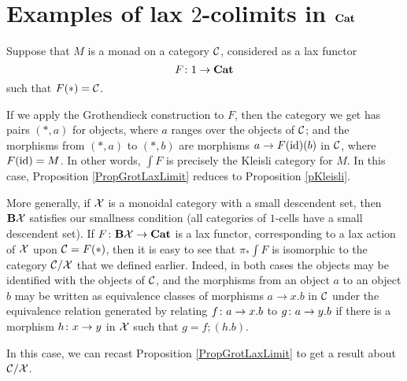 \section{Examples of lax $2$-colimits in ${\normalfont\textbf{Cat}}$}

Suppose that $M$ is a monad on a category ${\mathcal{C}}$, considered as a lax functor
\[
  F\colon 1\to {\normalfont\textbf{Cat}}
  \]
such that $F(*)={\mathcal{C}}$.

If we apply the Grothendieck construction to $F$, then the category we get has pairs $(*,a)$ for objects, where $a$ ranges over the objects of ${\mathcal{C}}$; and the morphisms from $(*,a)$ to $(*,b)$ are morphisms $a \to F(\operatorname{id})(b)$ in ${\mathcal{C}}$, where $F(\operatorname{id})=M$.  
In other words, $\int F$ is precisely the Kleisli category for $M$.
In this case, Proposition \ref{PropGrotLaxLimit} reduces to Proposition \ref{pKleisli}.

More generally, if $\mathcal X$ is a monoidal category with a small descendent set, then $\mathbf B\mathcal X$ satisfies our smallness condition (all categories of $1$-cells have a small descendent set).  
If $F\colon \mathbf B \mathcal X \to {\normalfont\textbf{Cat}}$ is a lax functor, corresponding to a lax action of $\mathcal X$ upon ${\mathcal{C}} = F(*)$, then it is easy to see that $\pi_*\int F$ is isomorphic to the category ${\mathcal{C}}/\mathcal X$ that we defined earlier.  
Indeed, in both cases the objects may be identified with the objects of ${\mathcal{C}}$, and the morphisms from an object $a$ to an object $b$ may be written as equivalence classes of morphisms $a \to x.b$ in ${\mathcal{C}}$ under the equivalence relation generated by relating $f\colon a \to x.b$ to $g\colon a \to y.b$ if there is a morphism $h\colon x \to y$ in $\mathcal X$ such that $g=f;(h.b)$.

In this case, we can recast Proposition \ref{PropGrotLaxLimit} to get a result about ${\mathcal{C}}/\mathcal X$.

